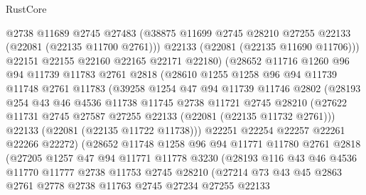 \begin{lexlean}{RustCore}
\begin{coremodule}
                @2738
                @11689
                @2745
                @27483
                (@38875 @11699 @2745 @28210 @27255 @22133 (@22081 (@22135 @11700 @2761)))
                @22133
                (@22081 (@22135 @11690 @11706)))
              @22151
              @22155
              @22160
              @22165
              @22171
              @22180)
            (@28652
              @11716
              @1260
              @96
              @94
              @11739
              @11783
              @2761
              @2818
              (@28610
                @1255
                @1258
                @96
                @94
                @11739
                @11748
                @2761
                @11783
                (@39258
                  @1254
                  @47
                  @94
                  @11739
                  @11746
                  @2802
                  (@28193
                    @254
                    @43
                    @46
                    @4536
                    @11738
                    @11745
                    @2738
                    @11721
                    @2745
                    @28210
                    (@27622 @11731 @2745 @27587 @27255 @22133 (@22081 (@22135 @11732 @2761)))
                    @22133
                    (@22081 (@22135 @11722 @11738)))
                  @22251
                  @22254
                  @22257
                  @22261
                  @22266
                  @22272)
                (@28652
                  @11748
                  @1258
                  @96
                  @94
                  @11771
                  @11780
                  @2761
                  @2818
                  (@27205
                    @1257
                    @47
                    @94
                    @11771
                    @11778
                    @3230
                    (@28193
                      @116
                      @43
                      @46
                      @4536
                      @11770
                      @11777
                      @2738
                      @11753
                      @2745
                      @28210
                      (@27214
                        @73
                        @43
                        @45
                        @2863
                        @2761
                        @2778
                        @2738
                        @11763
                        @2745
                        @27234
                        @27255
                        @22133

\end{coremodule}
\end{lexlean}
